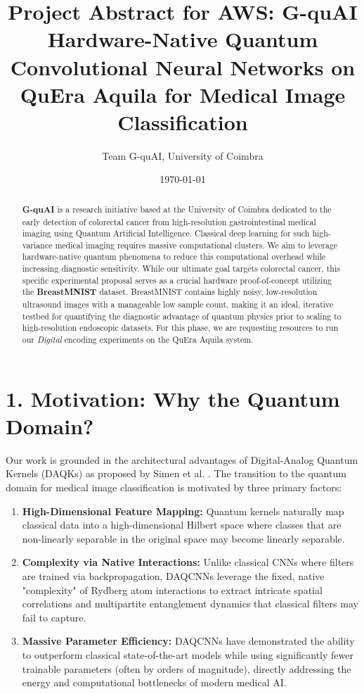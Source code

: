 \documentclass[11pt,a4paper]{article}
\title{Project Abstract for AWS: G-quAI \\ \large Hardware-Native Quantum Convolutional Neural Networks on QuEra Aquila for Medical Image Classification}
\author{Team G-quAI, University of Coimbra}
\date{\today}
\begin{document}
\maketitle

\begin{abstract}
\textbf{G-quAI} is a research initiative based at the University of Coimbra dedicated to the early detection of colorectal cancer from high-resolution gastrointestinal medical imaging using Quantum Artificial Intelligence. Classical deep learning for such high-variance medical imaging requires massive computational clusters. We aim to leverage hardware-native quantum phenomena to reduce this computational overhead while increasing diagnostic sensitivity. While our ultimate goal targets colorectal cancer, this specific experimental proposal serves as a crucial hardware proof-of-concept utilizing the \textbf{BreastMNIST} dataset. BreastMNIST contains highly noisy, low-resolution ultrasound images with a manageable low sample count, making it an ideal, iterative testbed for quantifying the diagnostic advantage of quantum physics prior to scaling to high-resolution endoscopic datasets. For this phase, we are requesting resources to run our \textit{Digital} encoding experiments on the QuEra Aquila system.
\end{abstract}

\section*{1. Motivation: Why the Quantum Domain?}
Our work is grounded in the architectural advantages of Digital-Analog Quantum Kernels (DAQKs) as proposed by Simen et al. \cite{daqcnn2024}. The transition to the quantum domain for medical image classification is motivated by three primary factors:
\begin{enumerate}
    \item \textbf{High-Dimensional Feature Mapping:} Quantum kernels naturally map classical data into a high-dimensional Hilbert space where classes that are non-linearly separable in the original space may become linearly separable.
    \item \textbf{Complexity via Native Interactions:} Unlike classical CNNs where filters are trained via backpropagation, DAQCNNs leverage the fixed, native "complexity" of Rydberg atom interactions to extract intricate spatial correlations and multipartite entanglement dynamics that classical filters may fail to capture.
    \item \textbf{Massive Parameter Efficiency:} DAQCNNs have demonstrated the ability to outperform classical state-of-the-art models while using significantly fewer trainable parameters (often by orders of magnitude), directly addressing the energy and computational bottlenecks of modern medical AI.
\end{enumerate}
\end{document}
